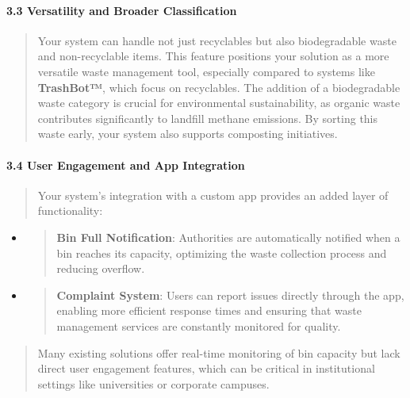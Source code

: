 \documentclass[
]{article}
\begin{document}
\hypertarget{versatility-and-broader-classification}{%
\paragraph{3.3 Versatility and Broader
Classification}\label{versatility-and-broader-classification}}

\begin{quote}
Your system can handle not just recyclables but also biodegradable waste
and non-recyclable items. This feature positions your solution as a more
versatile waste management tool, especially compared to systems like
\textbf{TrashBot™}, which focus on recyclables. The addition of a
biodegradable waste category is crucial for environmental
sustainability, as organic waste contributes significantly to landfill
methane emissions. By sorting this waste early, your system also
supports composting initiatives.
\end{quote}

\hypertarget{user-engagement-and-app-integration}{%
\paragraph{3.4 User Engagement and App
Integration}\label{user-engagement-and-app-integration}}

\begin{quote}
Your system's integration with a custom app provides an added layer of
functionality:
\end{quote}

\begin{itemize}
\item
  \begin{quote}
  \textbf{Bin Full Notification}: Authorities are automatically notified
  when a bin reaches its capacity, optimizing the waste collection
  process and reducing overflow.
  \end{quote}
\item
  \begin{quote}
  \textbf{Complaint System}: Users can report issues directly through
  the app, enabling more efficient response times and ensuring that
  waste management services are constantly monitored for quality.
  \end{quote}
\end{itemize}

\begin{quote}
Many existing solutions offer real-time monitoring of bin capacity but
lack direct user engagement features, which can be critical in
institutional settings like universities or corporate campuses.
\end{quote}
\end{document}
